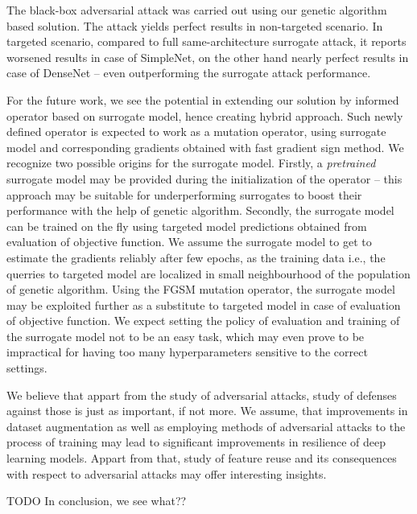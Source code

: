 The black-box adversarial attack was carried out using our genetic algorithm based solution. The attack yields perfect results in non-targeted scenario. In targeted scenario, compared to full same-architecture surrogate attack, it reports worsened results in case of SimpleNet, on the other hand nearly perfect results in case of DenseNet -- even outperforming the surrogate attack performance.

For the future work, we see the potential in extending our solution by informed operator based on surrogate model, hence creating hybrid approach. Such newly defined operator is expected to work as a mutation operator, using surrogate model and corresponding gradients obtained with fast gradient sign method. We recognize two possible origins for the surrogate model. Firstly, a \emph{pretrained} surrogate model may be provided during the initialization of the operator -- this approach may be suitable for underperforming surrogates to boost their performance with the help of genetic algorithm. Secondly, the surrogate model can be trained on the fly using targeted model predictions obtained from evaluation of objective function. We assume the surrogate model to get to estimate the gradients reliably after few epochs, as the training data i.e., the querries to targeted model are localized in small neighbourhood of the population of genetic algorithm. Using the FGSM mutation operator, the surrogate model may be exploited further as a substitute to targeted model in case of evaluation of objective function. We expect setting the policy of evaluation and training of the surrogate model not to be an easy task, which may even prove to be impractical for having too many hyperparameters sensitive to the correct settings.

We believe that appart from the study of adversarial attacks, study of defenses against those is just as important, if not more. We assume, that improvements in dataset augmentation as well as employing methods of adversarial attacks to the process of training may lead to significant improvements in resilience of deep learning models. Appart from that, study of feature reuse and its consequences with respect to adversarial attacks may offer interesting insights.

TODO In conclusion, we see what??
